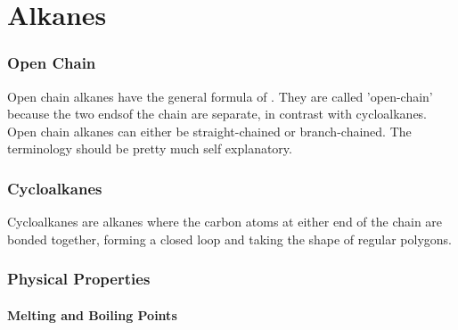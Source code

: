 

\pagebreak
\hypertarget{ChapterAlkanes}{}
\part{Alkanes}

	\section{Open Chain}

		Open chain alkanes have the general formula of . They are called 'open-chain' because
		the two endsof the chain are separate, in contrast with cycloalkanes. Open chain alkanes can either be straight-chained or branch-chained.
		The terminology should be pretty much self explanatory.





	\section{Cycloalkanes}

		Cycloalkanes are alkanes where the carbon atoms at either end of the chain are bonded together, forming a closed loop and
		taking the shape of regular polygons.




	\pagebreak
	\section{Physical Properties}
		\subsection{Melting and Boiling Points}

